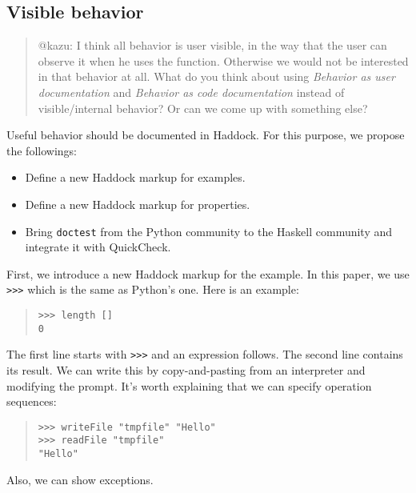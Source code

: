 \documentclass[preprint]{sigplanconf}
\begin{document}
\subsection{Visible behavior}
\label{sec:Visible-behavior}

\begin{quote}
    @kazu: I think all behavior is user visible, in the way that the user can
    observe it when he uses the function.  Otherwise we would not be interested
    in that behavior at all.  What do you think about using \emph{Behavior as
    user documentation} and \emph{Behavior as code documentation} instead of
    visible/internal behavior?  Or can we come up with something else?
\end{quote}

Useful behavior should be documented in Haddock.
For this purpose, we propose the followings:

\begin{itemize}
\item Define a new Haddock markup for examples.
\item Define a new Haddock markup for properties.
\item Bring {\tt doctest} from the Python community to the Haskell
community and integrate it with QuickCheck.
\end{itemize}

First, we introduce a new Haddock markup for the example.
In this paper, we use {\tt >>>} which is the same as Python's one.
Here is an example:

\begin{quote}
\small
\begin{verbatim}
>>> length []
0
\end{verbatim}
\end{quote}

\noindent The first line starts with {\tt >>>} and an expression follows. The second line contains its result. We can write this by copy-and-pasting from an interpreter and modifying the prompt.
It's worth explaining that we can specify operation sequences:

\begin{quote}
\small
\begin{verbatim}
>>> writeFile "tmpfile" "Hello"
>>> readFile "tmpfile"
"Hello"
\end{verbatim}
\end{quote}

\noindent Also, we can show exceptions.
\end{document}
